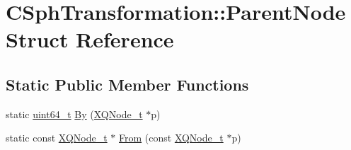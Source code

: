 \hypertarget{structCSphTransformation_1_1ParentNode}{\section{C\-Sph\-Transformation\-:\-:Parent\-Node Struct Reference}
\label{structCSphTransformation_1_1ParentNode}
}
\subsection*{Static Public Member Functions}
\begin{DoxyCompactItemize}
\item 
static \hyperlink{sphinxstd_8h_aaa5d1cd013383c889537491c3cfd9aad}{uint64\-\_\-t} \hyperlink{structCSphTransformation_1_1ParentNode_ac4b5b673f2f91bfa292632cfdd68a169}{By} (\hyperlink{structXQNode__t}{X\-Q\-Node\-\_\-t} $\ast$p)
\item 
static const \hyperlink{structXQNode__t}{X\-Q\-Node\-\_\-t} $\ast$ \hyperlink{structCSphTransformation_1_1ParentNode_ac10750ca9542ae5a276b480753a8e2c4}{From} (const \hyperlink{structXQNode__t}{X\-Q\-Node\-\_\-t} $\ast$p)
\end{DoxyCompactItemize}



